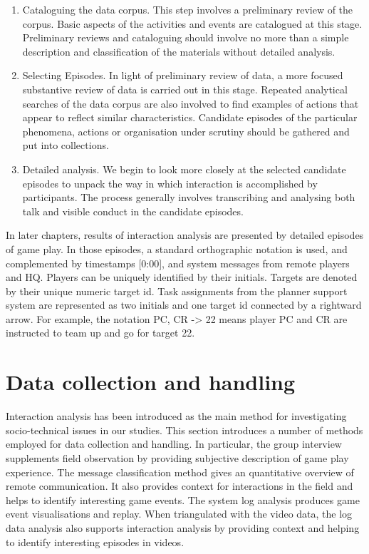 \begin{enumerate}

\item Cataloguing the data corpus. This step involves a preliminary review of the corpus. Basic aspects of the activities and events are catalogued at this stage. Preliminary reviews and cataloguing should involve no more than a simple description and classification of the materials without detailed analysis. \\

\item Selecting Episodes. In light of preliminary review of data, a more focused substantive review of data is carried out in this stage. Repeated analytical searches of the data corpus are also involved to find examples of actions that appear to reflect similar characteristics. Candidate episodes of the particular phenomena, actions or organisation under scrutiny should be gathered and put into collections. \\

\item Detailed analysis.  We begin to look more closely at the selected candidate episodes to unpack the way in which interaction is accomplished by participants. The process generally involves transcribing and analysing both talk and visible conduct in the candidate episodes. \\ 

\end{enumerate}

In later chapters, results of interaction analysis are presented by detailed episodes of game play. In those episodes, a standard orthographic notation is used, \cite{Jordan1995} and complemented by timestamps [0:00], and system messages from remote players and HQ. Players can be uniquely identified by their initials. Targets are denoted by their unique numeric target id. Task assignments from the planner support system are represented as two initials and one target id connected by a rightward arrow. For example, the notation PC, CR -> 22 means player PC and CR are instructed to team up and go for target 22.\\




\section{Data collection and handling}\label{sec:methdatahandling}
Interaction analysis has been introduced as the main method for investigating socio-technical issues in our studies. This section introduces a number of methods employed for data collection and handling. In particular, the group interview supplements field observation by providing subjective description of game play experience. The message classification method gives an quantitative overview of remote communication. It also provides context for interactions in the field and helps to identify interesting game events. The system log analysis produces game event visualisations and replay. When triangulated with the video data, the log data analysis also supports interaction analysis by providing context and helping to identify interesting episodes in videos.\\

